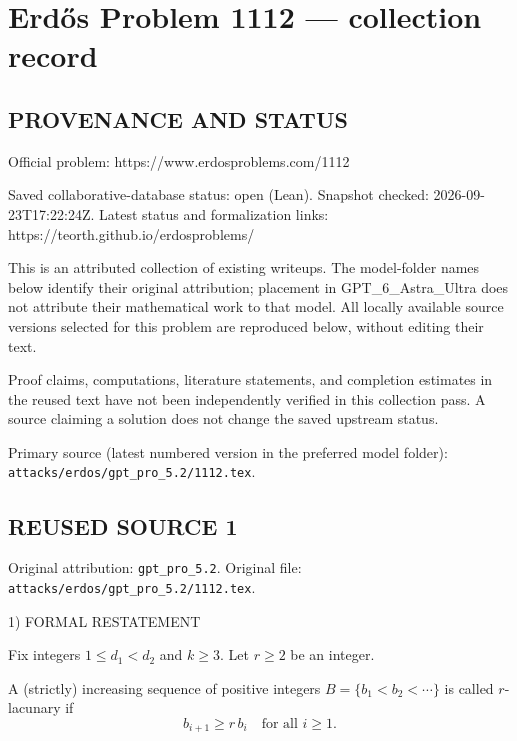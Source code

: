 \section*{Erd\H{o}s Problem 1112 --- collection record}

\subsection*{PROVENANCE AND STATUS}
Official problem: https://www.erdosproblems.com/1112

Saved collaborative-database status: open (Lean).
Snapshot checked: 2026-09-23T17:22:24Z.
Latest status and formalization links: https://teorth.github.io/erdosproblems/

This is an attributed collection of existing writeups. The model-folder names below identify their original attribution; placement in GPT\_6\_Astra\_Ultra does not attribute their mathematical work to that model. All locally available source versions selected for this problem are reproduced below, without editing their text.

Proof claims, computations, literature statements, and completion estimates in the reused text have not been independently verified in this collection pass. A source claiming a solution does not change the saved upstream status.

Primary source (latest numbered version in the preferred model folder): \texttt{attacks/erdos/gpt\_pro\_5.2/1112.tex}.

\subsection*{REUSED SOURCE 1}
Original attribution: \texttt{gpt\_pro\_5.2}.
Original file: \texttt{attacks/erdos/gpt\_pro\_5.2/1112.tex}.


1) FORMAL RESTATEMENT

Fix integers \(1\le d_1<d_2\) and \(k\ge 3\).  Let \(r\ge 2\) be an integer.

A (strictly) increasing sequence of positive integers \(B=\{b_1<b_2<\cdots\}\) is called \(r\)-lacunary if
\[
 b_{i+1}\ge r\,b_i\quad\text{for all }i\ge 1.
\]

